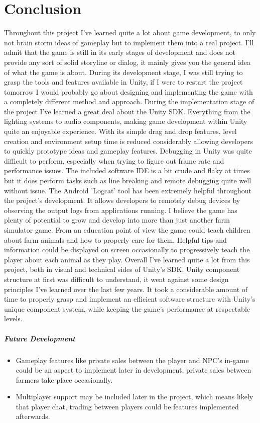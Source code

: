 \chapter{Conclusion}
Throughout this project I've learned quite a lot about game development, to only not brain storm ideas of gameplay but to implement them into a real project. I'll admit that the game is still in its early stages of development and does not provide any sort of solid storyline or dialog, it mainly gives you the general idea of what the game is about. During its development stage, I was still trying to grasp the tools and features available in Unity, if I were to restart the project tomorrow I would probably go about designing and implementing the game with a completely different method and approach.
During the implementation stage of the project I've learned a great deal about the Unity SDK. Everything from the lighting systems to audio components, making game development within Unity quite an enjoyable experience. With its simple drag and drop features, level creation and environment setup time is reduced considerably allowing developers to quickly prototype ideas and gameplay features.
Debugging in Unity was quite difficult to perform, especially when trying to figure out frame rate and performance issues. The included software IDE is a bit crude and flaky at times but it does perform tasks such as line breaking and remote debugging quite well without issue. The Android 'Logcat' tool has been extremely helpful throughout the project's development. It allows developers to remotely debug devices by observing the output logs from applications running.
I believe the game has plenty of potential to grow and develop into more than just another farm simulator game. From an education point of view the game could teach children about farm animals and how to properly care for them. Helpful tips and information could be displayed on screen occasionally to progressively teach the player about each animal as they play. 
Overall I've learned quite a lot from this project, both in visual and technical sides of Unity's SDK. Unity component structure at first was difficult to understand, it went against some design principles I've learned over the last few years. It took a considerable amount of time to properly grasp and implement an efficient software structure with Unity's unique component system, while keeping the game's performance at respectable levels.
\paragraph{Future Development}
\begin{itemize}
\item Gameplay features like private sales between the player and NPC's in-game could be an aspect to implement later in development, private sales between farmers take place occasionally. 
\item Multiplayer support may be included later in the project, which means likely that player chat, trading between players could be features implemented afterwards. 
\end{itemize}